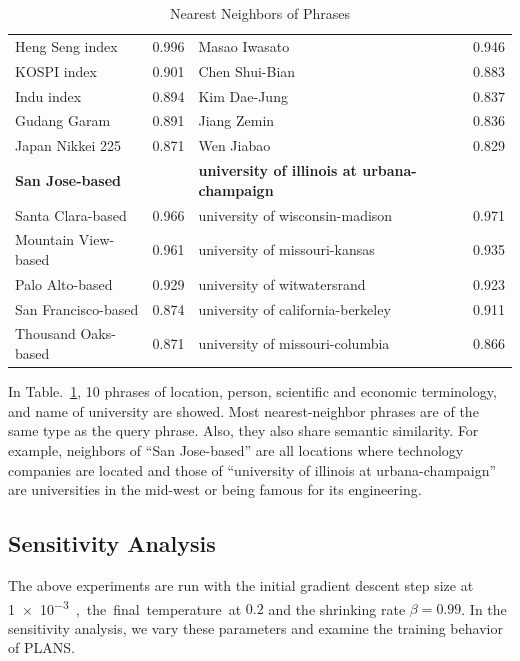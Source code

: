 \begin{table}[h]
\begin{tabular}{lc|lc}
    Heng Seng index         & 0.996 &  Masao Iwasato   & 0.946     \\
    KOSPI index             & 0.901 &  Chen Shui-Bian  & 0.883     \\
    Indu index              & 0.894 &  Kim Dae-Jung    & 0.837     \\
    Gudang Garam            & 0.891 &  Jiang Zemin     & 0.836     \\
    Japan Nikkei 225        & 0.871 &  Wen Jiabao      & 0.829     \\
    \hline \hline
    \textbf{San Jose-based} && \textbf{university of illinois at urbana-champaign} &   \\
    Santa Clara-based     & 0.966 &     university of wisconsin-madison     & 0.971    \\
    Mountain View-based   & 0.961 &     university of missouri-kansas       & 0.935    \\
    Palo Alto-based       & 0.929 &     university of witwatersrand         & 0.923    \\
    San Francisco-based   & 0.874 &     university of california-berkeley   & 0.911    \\
    Thousand Oaks-based   & 0.871 &     university of missouri-columbia     & 0.866    \\
    \hline \hline
  \end{tabular}
  \caption{Nearest Neighbors of Phrases}
  \label{tab::plans_nn}
\end{table}

In Table.~\ref{tab::plans_nn}, 10 phrases of location, person, scientific and
economic terminology, and name of university are showed. Most nearest-neighbor
phrases are of the same type as the query phrase. Also, they also share semantic
similarity. For example, neighbors of ``San Jose-based'' are all locations where
technology companies are located and those of ``university of illinois at
urbana-champaign'' are universities in the mid-west or being famous for its
engineering.

\subsection{Sensitivity Analysis}

The above experiments are run with the initial gradient descent step
size at \SI{1e-3}, the final temperature at $0.2$ and the shrinking rate $\beta
= 0.99$. In the sensitivity analysis, we vary these parameters and examine the
training behavior of PLANS.


